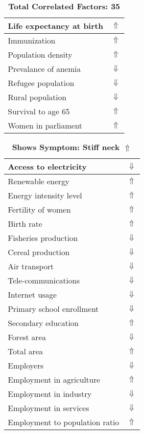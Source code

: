 \documentclass[12pt,notitlepage,oneside]{report}
\begin{document}
\begin{table}[!htb]
\begin{tabular}{|l|l|}
Life expectancy at birth & $\Uparrow$\\ \hline
Immunization & $\Uparrow$\\ \hline
Population density & $\Uparrow$\\ \hline
Prevalance of anemia & $\Downarrow$\\ \hline
Refugee population & $\Downarrow$\\ \hline
Rural population & $\Downarrow$\\ \hline
Survival to age 65 & $\Uparrow$\\ \hline
Women in parliament & $\Uparrow$\\ \hline
\end{tabular}
\caption*{\textbf{Total Correlated Factors: 35}}
\end{table}
\clearpage
\begin{table}[!htb]
\caption{\textbf{Shows Symptom: Stiff neck $\Uparrow$}}
\centering
\label{Correlated Socio-economic Factors0}
\begin{tabular}{|l|l|}
\hline
Access to electricity & $\Downarrow$\\ \hline
Renewable energy & $\Uparrow$\\ \hline
Energy intensity level & $\Uparrow$\\ \hline
Fertility of women & $\Uparrow$\\ \hline
Birth rate & $\Uparrow$\\ \hline
Fisheries production & $\Downarrow$\\ \hline
Cereal production & $\Downarrow$\\ \hline
Air transport  & $\Downarrow$\\ \hline
Tele-communications & $\Downarrow$\\ \hline
Internet usage & $\Downarrow$\\ \hline
Primary school enrollment & $\Downarrow$\\ \hline
Secondary education & $\Uparrow$\\ \hline
Forest area & $\Downarrow$\\ \hline
Total area & $\Uparrow$\\ \hline
Employers & $\Downarrow$\\ \hline
Employment in agriculture & $\Uparrow$\\ \hline
Employment in industry & $\Downarrow$\\ \hline
Employment in services & $\Downarrow$\\ \hline
Employment to population ratio & $\Uparrow$\\ \hline

\end{tabular}
\end{table}
\end{document}
